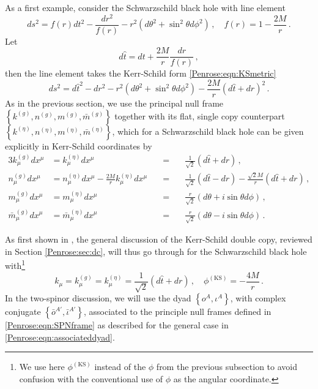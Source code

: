 As a first example, consider the Schwarzschild black hole with line element
\begin{equation}\label{Penrose:eqn:Smetric}
ds^2 = f(r)dt^2-\frac{dr^2}{f(r)} -r^2 \left(d\theta^2 + \sin^2\theta d \phi^2\right) \, , \quad f(r) = 1-\frac{2M}{r} \, .
\end{equation}
Let
\begin{equation}
d\hat{t} =  dt + \frac{2M}{r}\frac{dr}{f(r)} \, ,
\end{equation}
then the line element takes the Kerr-Schild form \eqref{Penrose:eqn:KSmetric}
\begin{equation}\label{Penrose:eqn:SmetricKS}
ds^2 = d\hat{t}^2- dr^2-r^2 \left(d\theta^2 + \sin^2\theta d \phi^2\right) -\frac{2M}{r}(d\hat{t} + dr)^2  \, .
\end{equation}
As in the previous section, we use the principal null frame $\left\lbrace  k^{(g)},  n^{(g)}, m^{(g)}, \bar{m}^{(g)}\right \rbrace$ together with its flat, single copy counterpart $\left\lbrace  k^{(\eta)},  n^{(\eta)}, m^{(\eta)}, \bar{m}^{(\eta)}\right \rbrace$, which for a Schwarzschild black hole can be given explicitly in Kerr-Schild coordinates by
\begin{alignat}{3}
k^{(g)}_{\mu}dx^{\mu} &= k^{(\eta)}_{\mu}dx^{\mu} &=& \quad \frac{1}{\sqrt{2}}\left(d\hat{t} +dr\right)  \, , \nonumber \\
n^{(g)}_{\mu}dx^{\mu} &= n^{(\eta)}_{\mu}dx^{\mu} - \frac{2M}{r}   k^{(\eta)}_{\mu}dx^{\mu}  \quad &=& \quad \frac{1}{\sqrt{2}}\left( d\hat{t} - dr\right)- \frac{\sqrt{2}M}{r}  \left(d\hat{t} +dr\right) \, , \nonumber \\
m^{(g)}_{\mu}dx^{\mu} &= m^{(\eta)}_{\mu}dx^{\mu} &=& \quad \frac{r}{\sqrt{2}} \left(d\theta + i \sin{\theta}d\phi\right) \, , \nonumber \\
\bar{m}^{(g)}_{\mu}dx^{\mu} &= \bar{m}^{(\eta)}_{\mu}dx^{\mu} &=& \quad \frac{r}{\sqrt{2}} \left(d\theta -i \sin{\theta}d\phi\right) \, . \label{Penrose:eqn:SPNframe}
\end{alignat}

As first shown in \cite{Monteiro:2014cda}, the general discussion of the Kerr-Schild double copy, reviewed in
Section \ref{Penrose:sec:dc}, will thus go through for the Schwarzschild black hole with\footnote{We use here
$\phi^{(\mathrm{KS})}$ instead of the $\phi$ from the previous subsection to avoid confusion with the conventional use of $\phi$ as the angular coordinate.}
\begin{equation}\label{Penrose:eqn:SKSsinglecopy}
k_{\mu} = k^{(g)}_{\mu} = k^{(\eta)}_{\mu} = \frac{1}{\sqrt{2}}\left(d\hat{t} +dr\right) \, , \quad \phi^{(\mathrm{KS})} =  -\frac{4M}{r}  \, .
\end{equation}
%
In the two-spinor discussion, we will use the dyad $\left\lbrace o^A, \iota^A \right\rbrace$, with complex conjugate $\left\lbrace \bar{o}^{A'}, \bar{\iota}^{A'} \right\rbrace$, associated to the principle null frames defined in \eqref{Penrose:eqn:SPNframe} as described for the general case in \eqref{Penrose:eqn:associateddyad}.

